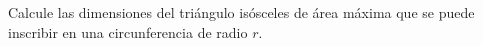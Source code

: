 \item Calcule las dimensiones del triángulo isósceles de área máxima que se puede inscribir en una circunferencia de radio $r$.
